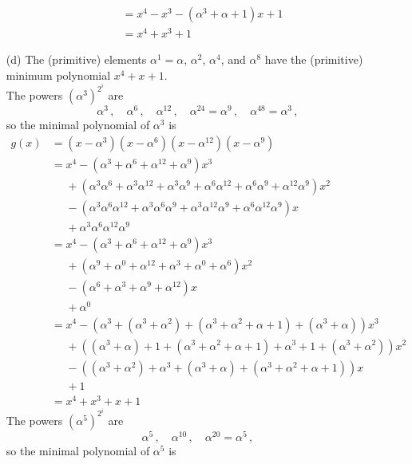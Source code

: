 \documentclass[11pt]{article}
\newcommand{\ph}{\phantom}
\begin{document}
\begin{itemize}
\begin{align*}
           &= x^4 - x^3 - (\alpha^3+\alpha+ 1)x + 1\\
           &= x^4 + x^3 + 1
    \end{align*} 
  \item[{(d)}] The (primitive) elements $\alpha^1 = \alpha$, $\alpha^2$, $\alpha^4$, and $\alpha^8$ have the (primitive) minimum polynomial $x^4 + x + 1$.\\
    The powers $(\alpha^3)^{2^i}$ are
    \[
      \alpha^3\,,\quad
      \alpha^6\,,\quad
      \alpha^{12}\,,\quad
      \alpha^{24} = \alpha^9\,,\quad
      \alpha^{48} = \alpha^{3}\,,
    \]
    so the minimal polynomial of $\alpha^3$ is
    \begin{align*}
      g(x) &= (x-\alpha^3)(x-\alpha^6)(x-\alpha^{12})(x-\alpha^9)\\
           &= x^4 - (\alpha^3+\alpha^6+\alpha^{12}+\alpha^9)x^3\\
           &\ph{=} + (\alpha^3\alpha^6+\alpha^3\alpha^{12}+\alpha^3\alpha^9+\alpha^6\alpha^{12}+\alpha^6\alpha^9+\alpha^{12}\alpha^9)x^2\\
           &\ph{=} - (\alpha^3\alpha^6\alpha^{12}+\alpha^3\alpha^6\alpha^9+\alpha^3\alpha^{12}\alpha^9+\alpha^6\alpha^{12}\alpha^9)x\\
           &\ph{=} +  \alpha^3\alpha^6\alpha^{12}\alpha^9\\
           &= x^4 - (\alpha^3+\alpha^6+\alpha^{12}+\alpha^9)x^3\\
           &\ph{=} + (\alpha^9+\alpha^0+\alpha^{12}+\alpha^3+\alpha^0+\alpha^6)x^2\\
           &\ph{=} - (\alpha^6+\alpha^3+\alpha^9+\alpha^{12})x\\
           &\ph{=} +  \alpha^0\\
           &= x^4 - (\alpha^3 + (\alpha^3 + \alpha^2) + (\alpha^3 + \alpha^2 + \alpha + 1) + (\alpha^3 + \alpha))x^3\\
           &\ph{=} + ((\alpha^3 + \alpha) + 1 + (\alpha^3 + \alpha^2 + \alpha + 1) + \alpha^3 + 1 + (\alpha^3 + \alpha^2))x^2\\
           &\ph{=} - ((\alpha^3 + \alpha^2) + \alpha^3 + (\alpha^3 + \alpha) + (\alpha^3 + \alpha^2 + \alpha + 1))x\\
           &\ph{=} +  1\\
           &= x^4 + x^3 + x + 1
    \end{align*}
    The powers $(\alpha^5)^{2^i}$ are
    \[
      \alpha^5\,,\quad
      \alpha^{10}\,,\quad
      \alpha^{20} = \alpha^5\,,
    \]
    so the minimal polynomial of $\alpha^5$ is

\end{itemize}
\end{document}
